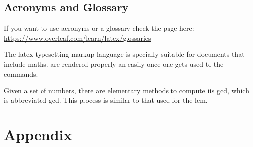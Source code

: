 \documentclass[a4paper,fontsize=12pt,listof=totoc,bibliography=totoc]{scrbook}
\begin{document}
\section{Acronyms and Glossary}

If you want to use acronyms or a glossary check the page here: \url{https://www.overleaf.com/learn/latex/glossaries}

The \Gls{latex} typesetting markup language is specially suitable 
for documents that include \gls{maths}. are 
rendered properly an easily once one gets used to the commands.

Given a set of numbers, there are elementary methods to compute 
its \acrlong{gcd}, which is abbreviated \acrshort{gcd}. This 
process is similar to that used for the \acrfull{lcm}.






\printglossary[type=\acronymtype]
\printglossary

\cleardoublepage{}
\pagebreak
	
\appendix{}

\chapter{Appendix}
	
\end{document}
